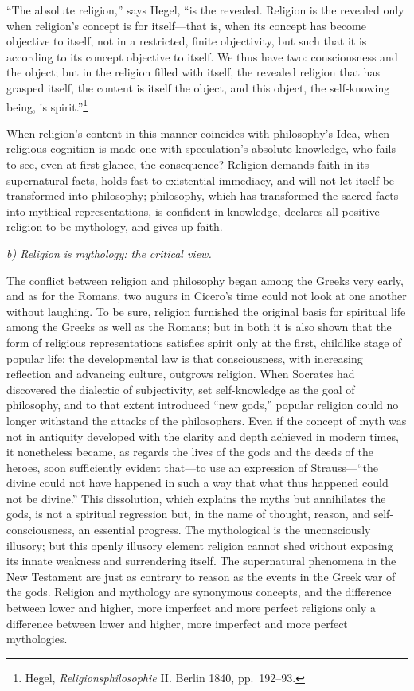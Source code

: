\documentclass[12pt,a4paper]{article}
\begin{document}
``The absolute religion,'' says Hegel, ``is the revealed. Religion
is the revealed only when religion's concept is for itself---that
is, when its concept has become objective to itself, not in a
restricted, finite objectivity, but such that it is according to
its concept objective to itself. We thus have two: consciousness
and the object; but in the religion filled with itself, the
revealed religion that has grasped itself, the content is itself
the object, and this object, the self-knowing being, is
spirit.''\footnote{Hegel, \textit{Religionsphilosophie} II.
Berlin 1840, pp.\ 192--93.}

When religion's content in this manner coincides with
philosophy's Idea, when religious cognition is made one with
speculation's absolute knowledge, who fails to see, even at
first glance, the consequence? Religion demands faith in its
supernatural facts, holds fast to existential immediacy, and
will not let itself be transformed into philosophy; philosophy,
which has transformed the sacred facts into mythical
representations, is confident in knowledge, declares all
positive religion to be mythology, and gives up faith.

\medskip
\noindent\textit{b) Religion is mythology: the critical view.}
\medskip

The conflict between religion and philosophy began among the
Greeks very early, and as for the Romans, two augurs in Cicero's
time could not look at one another without laughing. To be sure,
religion furnished the original basis for spiritual life among
the Greeks as well as the Romans; but in both it is also shown
that the form of religious representations satisfies spirit only
at the first, childlike stage of popular life: the developmental
law is that consciousness, with increasing reflection and
advancing culture, outgrows religion. When Socrates had
discovered the dialectic of subjectivity, set self-knowledge as
the goal of philosophy, and to that extent introduced ``new
gods,'' popular religion could no longer withstand the attacks
of the philosophers. Even if the concept of myth was not in
antiquity developed with the clarity and depth achieved in
modern times, it nonetheless became, as regards the lives of the
gods and the deeds of the heroes, soon sufficiently evident
that---to use an expression of Strauss---``the divine could not
have happened in such a way that what thus happened could not be
divine.'' This dissolution, which explains the myths but
annihilates the gods, is not a spiritual regression but, in the
name of thought, reason, and self-consciousness, an essential
progress. The mythological is the unconsciously illusory; but
this openly illusory element religion cannot shed without
exposing its innate weakness and surrendering itself. The
supernatural phenomena in the New Testament are just as contrary
to reason as the events in the Greek war of the gods. Religion
and mythology are synonymous concepts, and the difference
between lower and higher, more imperfect and more perfect
religions only a difference between lower and higher, more
imperfect and more perfect mythologies.
\end{document}
